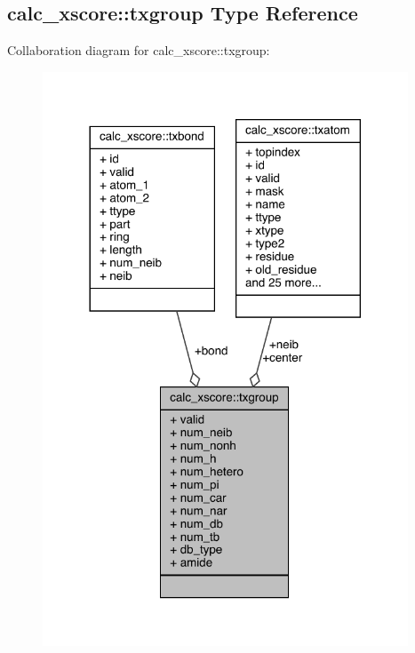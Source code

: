\hypertarget{structcalc__xscore_1_1txgroup}{\subsection{calc\-\_\-xscore\-:\-:txgroup Type Reference}
\label{structcalc__xscore_1_1txgroup}
}


Collaboration diagram for calc\-\_\-xscore\-:\-:txgroup\-:
\nopagebreak
\begin{figure}[H]
\begin{center}
\leavevmode
\includegraphics[width=308pt]{structcalc__xscore_1_1txgroup__coll__graph}
\end{center}
\end{figure}
